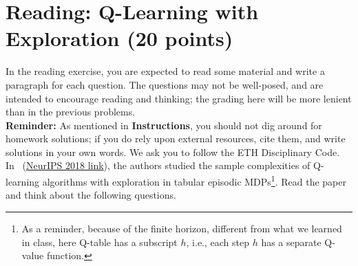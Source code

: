 \clearpage

\section{Reading: Q-Learning with Exploration (20 points)}
In the reading exercise, you are expected to read some material and write a paragraph for each question.
The questions may not be well-posed, and are intended to encourage reading and thinking;
the grading here will be more lenient than in the previous problems.
\\

\textbf{Reminder:} As mentioned in \textbf{Instructions}, you should not dig around for homework solutions; if you do rely upon external resources, cite them, and write solutions in your own words. We ask you to follow the ETH Disciplinary Code.
\\

In~\cite{jin2018q} (\href{https://papers.nips.cc/paper/2018/file/d3b1fb02964aa64e257f9f26a31f72cf-Paper.pdf}{NeurIPS 2018 link}), the authors studied the sample complexities of Q-learning algorithms with exploration in tabular episodic MDPs\footnote{As a reminder, because of the finite horizon, different from what we learned in class, here Q-table has a subscript $h$, i.e., each step $h$ has a separate Q-value function.}. Read the paper \cite{jin2018q} and think about the following questions. 

